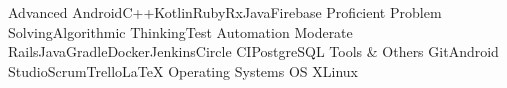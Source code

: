 \begin{cvskills}
  \cvskill
    {Advanced}
    {Android{\dotsep}C++{\dotsep}Kotlin{\dotsep}Ruby{\dotsep}RxJava{\dotsep}Firebase}
  \cvskill
    {Proficient}
    {Problem Solving{\dotsep}Algorithmic Thinking{\dotsep}Test Automation}
  \cvskill
    {Moderate}
    {Rails{\dotsep}Java{\dotsep}Gradle{\dotsep}Docker{\dotsep}Jenkins{\dotsep}Circle CI{\dotsep}PostgreSQL}
  \cvskill
    {Tools \& Others}
    {Git{\dotsep}Android Studio{\dotsep}Scrum{\dotsep}Trello{\dotsep}\LaTeX}
  \cvskill
    {Operating Systems}
    {OS X{\dotsep}Linux}
\end{cvskills}
